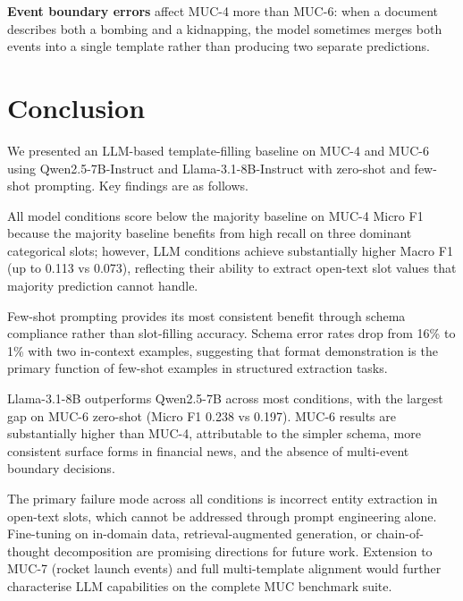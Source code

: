 \documentclass[11pt,a4paper]{article}
\begin{document}
\textbf{Event boundary errors} affect MUC-4 more than MUC-6: when a document describes both a bombing and a kidnapping, the model sometimes merges both events into a single template rather than producing two separate predictions.

\section{Conclusion}
\label{sec:conclusion}

We presented an LLM-based template-filling baseline on MUC-4 and MUC-6 using Qwen2.5-7B-Instruct and Llama-3.1-8B-Instruct with zero-shot and few-shot prompting. Key findings are as follows.

All model conditions score below the majority baseline on MUC-4 Micro F1 because the majority baseline benefits from high recall on three dominant categorical slots; however, LLM conditions achieve substantially higher Macro F1 (up to 0.113 vs 0.073), reflecting their ability to extract open-text slot values that majority prediction cannot handle.

Few-shot prompting provides its most consistent benefit through schema compliance rather than slot-filling accuracy. Schema error rates drop from 16\% to 1\% with two in-context examples, suggesting that format demonstration is the primary function of few-shot examples in structured extraction tasks.

Llama-3.1-8B outperforms Qwen2.5-7B across most conditions, with the largest gap on MUC-6 zero-shot (Micro F1 0.238 vs 0.197). MUC-6 results are substantially higher than MUC-4, attributable to the simpler schema, more consistent surface forms in financial news, and the absence of multi-event boundary decisions.

The primary failure mode across all conditions is incorrect entity extraction in open-text slots, which cannot be addressed through prompt engineering alone. Fine-tuning on in-domain data, retrieval-augmented generation, or chain-of-thought decomposition are promising directions for future work. Extension to MUC-7 (rocket launch events) and full multi-template alignment would further characterise LLM capabilities on the complete MUC benchmark suite.
\end{document}
